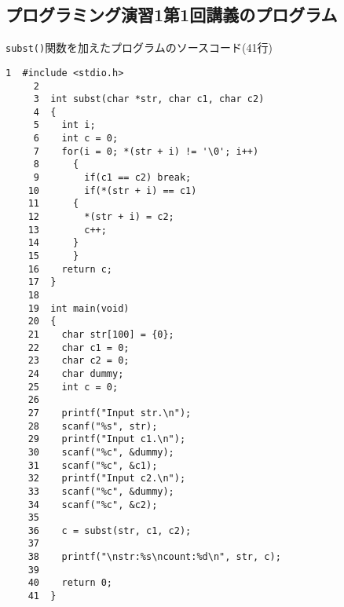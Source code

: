 \subsection{プログラミング演習1第1回講義のプログラム}\label{func1}
\verb|subst()|関数を加えたプログラムのソースコード(41行)
\begin{Verbatim}[fontsize=\small, baselinestretch=0.8]
     1	#include <stdio.h>
     2	
     3	int subst(char *str, char c1, char c2)
     4	{
     5	  int i;
     6	  int c = 0;
     7	  for(i = 0; *(str + i) != '\0'; i++)
     8	    {
     9	      if(c1 == c2) break;
    10	      if(*(str + i) == c1)
    11		{
    12		  *(str + i) = c2;
    13		  c++;
    14		}
    15	    }
    16	  return c;
    17	}
    18	
    19	int main(void)
    20	{
    21	  char str[100] = {0};
    22	  char c1 = 0;
    23	  char c2 = 0;
    24	  char dummy;
    25	  int c = 0; 
    26	
    27	  printf("Input str.\n");
    28	  scanf("%s", str);
    29	  printf("Input c1.\n");
    30	  scanf("%c", &dummy);
    31	  scanf("%c", &c1);
    32	  printf("Input c2.\n");
    33	  scanf("%c", &dummy);
    34	  scanf("%c", &c2);
    35	
    36	  c = subst(str, c1, c2);
    37	  
    38	  printf("\nstr:%s\ncount:%d\n", str, c);
    39	
    40	  return 0;
    41	}
\end{Verbatim}

